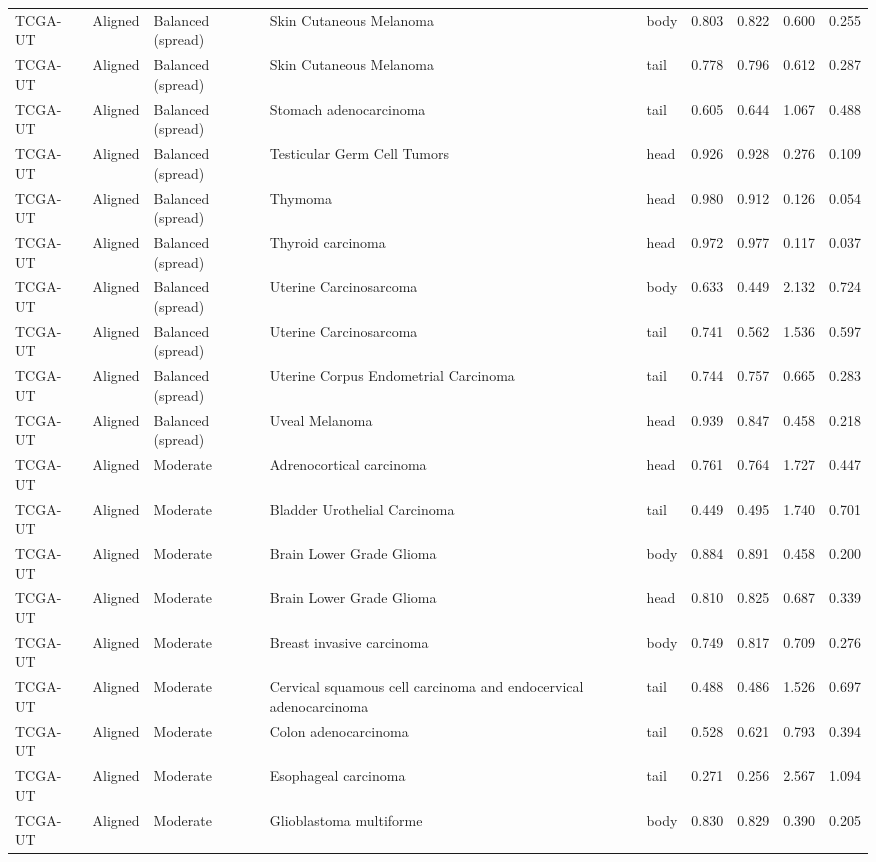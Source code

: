 \begin{longtable}{lllllrrrr}
TCGA-UT & Aligned & Balanced (spread) & Skin Cutaneous Melanoma & body & 0.803 & 0.822 & 0.600 & 0.255 \\
TCGA-UT & Aligned & Balanced (spread) & Skin Cutaneous Melanoma & tail & 0.778 & 0.796 & 0.612 & 0.287 \\
TCGA-UT & Aligned & Balanced (spread) & Stomach adenocarcinoma & tail & 0.605 & 0.644 & 1.067 & 0.488 \\
TCGA-UT & Aligned & Balanced (spread) & Testicular Germ Cell Tumors & head & 0.926 & 0.928 & 0.276 & 0.109 \\
TCGA-UT & Aligned & Balanced (spread) & Thymoma & head & 0.980 & 0.912 & 0.126 & 0.054 \\
TCGA-UT & Aligned & Balanced (spread) & Thyroid carcinoma & head & 0.972 & 0.977 & 0.117 & 0.037 \\
TCGA-UT & Aligned & Balanced (spread) & Uterine Carcinosarcoma & body & 0.633 & 0.449 & 2.132 & 0.724 \\
TCGA-UT & Aligned & Balanced (spread) & Uterine Carcinosarcoma & tail & 0.741 & 0.562 & 1.536 & 0.597 \\
TCGA-UT & Aligned & Balanced (spread) & Uterine Corpus Endometrial Carcinoma & tail & 0.744 & 0.757 & 0.665 & 0.283 \\
TCGA-UT & Aligned & Balanced (spread) & Uveal Melanoma & head & 0.939 & 0.847 & 0.458 & 0.218 \\
TCGA-UT & Aligned & Moderate & Adrenocortical carcinoma & head & 0.761 & 0.764 & 1.727 & 0.447 \\
TCGA-UT & Aligned & Moderate & Bladder Urothelial Carcinoma & tail & 0.449 & 0.495 & 1.740 & 0.701 \\
TCGA-UT & Aligned & Moderate & Brain Lower Grade Glioma & body & 0.884 & 0.891 & 0.458 & 0.200 \\
TCGA-UT & Aligned & Moderate & Brain Lower Grade Glioma & head & 0.810 & 0.825 & 0.687 & 0.339 \\
TCGA-UT & Aligned & Moderate & Breast invasive carcinoma & body & 0.749 & 0.817 & 0.709 & 0.276 \\
TCGA-UT & Aligned & Moderate & Cervical squamous cell carcinoma and endocervical adenocarcinoma & tail & 0.488 & 0.486 & 1.526 & 0.697 \\
TCGA-UT & Aligned & Moderate & Colon adenocarcinoma & tail & 0.528 & 0.621 & 0.793 & 0.394 \\
TCGA-UT & Aligned & Moderate & Esophageal carcinoma & tail & 0.271 & 0.256 & 2.567 & 1.094 \\
TCGA-UT & Aligned & Moderate & Glioblastoma multiforme & body & 0.830 & 0.829 & 0.390 & 0.205 \\

\end{longtable}

